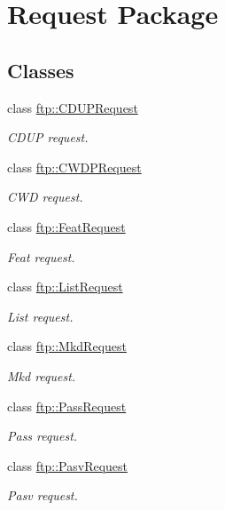 \hypertarget{group__request}{\section{Request Package}
\label{group__request}
}
\subsection*{Classes}
\begin{DoxyCompactItemize}
\item 
class \hyperlink{classftp_1_1_c_d_u_p_request}{ftp\-::\-C\-D\-U\-P\-Request}
\begin{DoxyCompactList}\small\item\em C\-D\-U\-P request. \end{DoxyCompactList}\item 
class \hyperlink{classftp_1_1_c_w_d_p_request}{ftp\-::\-C\-W\-D\-P\-Request}
\begin{DoxyCompactList}\small\item\em C\-W\-D request. \end{DoxyCompactList}\item 
class \hyperlink{classftp_1_1_feat_request}{ftp\-::\-Feat\-Request}
\begin{DoxyCompactList}\small\item\em Feat request. \end{DoxyCompactList}\item 
class \hyperlink{classftp_1_1_list_request}{ftp\-::\-List\-Request}
\begin{DoxyCompactList}\small\item\em List request. \end{DoxyCompactList}\item 
class \hyperlink{classftp_1_1_mkd_request}{ftp\-::\-Mkd\-Request}
\begin{DoxyCompactList}\small\item\em Mkd request. \end{DoxyCompactList}\item 
class \hyperlink{classftp_1_1_pass_request}{ftp\-::\-Pass\-Request}
\begin{DoxyCompactList}\small\item\em Pass request. \end{DoxyCompactList}\item 
class \hyperlink{classftp_1_1_pasv_request}{ftp\-::\-Pasv\-Request}
\begin{DoxyCompactList}\small\item\em Pasv request. \end{DoxyCompactList}\item 

\end{DoxyCompactItemize}
